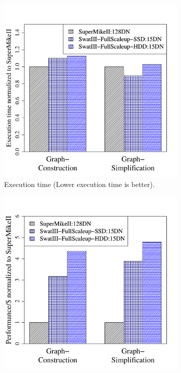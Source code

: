 \documentclass[conference]{IEEEtran}
\begin{document}
\begin{figure}[htb]
\center
        \begin{subfigure}[b]{0.23\textwidth}
                \includegraphics[width=\textwidth]{Figure/PerormanceData/Plots/PerfDiffArchHum.pdf}
                \caption{Execution time (Lower execution time is better).}
                \label{fig:DifferentArchitecturesPerfHum}
        \end{subfigure}
        \begin{subfigure}[b]{0.23\textwidth}
                \includegraphics[width=\textwidth]{Figure/PerormanceData/Plots/PerfPerDollarDiffArchHum.pdf}

\end{subfigure}
\end{figure}
\end{document}
